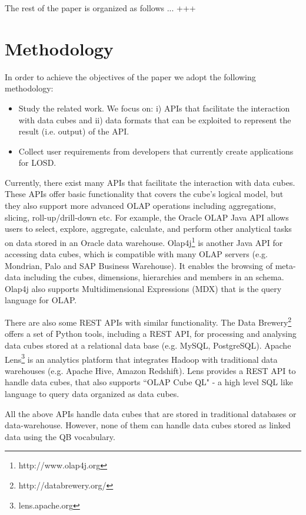 \documentclass{llncs}
\begin{document}
The rest of the paper is organized as follows ... +++

\section{Methodology}\label{sec:methodology}

In order to achieve the objectives of the paper we adopt the following methodology:
\begin{itemize}
\item Study the related work. We focus on: i) APIs that facilitate the interaction with data cubes and ii) data formats that can be exploited to represent the result (i.e. output) of the API. 
\item Collect user requirements from developers that currently create applications for LOSD. 
\end{itemize}

Currently, there exist many APIs that facilitate the interaction with data cubes. These APIs offer basic functionality that covers the cube's logical model, but they also support more advanced OLAP operations including aggregations, slicing, roll-up/drill-down etc. For example, the Oracle OLAP Java API \cite{ORACLEAPI} allows users to select, explore, aggregate, calculate, and perform other analytical tasks on data stored in an Oracle data warehouse. Olap4j\footnote{http://www.olap4j.org} is another Java API for accessing data cubes, which is compatible with many OLAP servers (e.g. Mondrian, Palo and SAP Business Warehouse). It enables the browsing of meta-data including the cubes, dimensions, hierarchies and members in an schema. Olap4j also supports Multidimensional Expressions (MDX) that is the query language for OLAP.

There are also some REST APIs with similar functionality. The Data Brewery\footnote{http://databrewery.org/} offers a set of Python tools, including a REST API, for processing and analysing data cubes stored at a relational data base (e.g. MySQL, PostgreSQL). Apache Lens\footnote{lens.apache.org} is an analytics platform that integrates Hadoop with traditional data warehouses (e.g. Apache Hive, Amazon Redshift). Lens provides a REST API to handle data cubes, that also supports ``OLAP Cube QL" - a high level SQL like language to query data organized as data cubes.

All the above APIs handle data cubes that are stored in traditional databases or data-warehouse. However, none of them can handle data cubes  stored as linked data using the QB vocabulary.  
\end{document}
